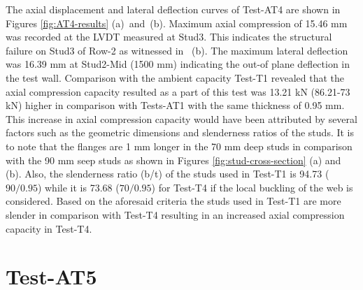 The axial displacement and lateral deflection curves of Test-AT4 are shown in Figures \ref{fig:AT4-results} (a)~and~(b). Maximum axial compression of 15.46 mm was recorded at the LVDT measured at Stud3. This indicates the structural failure on Stud3 of Row-2 as witnessed in ~(b). The maximum lateral deflection was 16.39 mm at Stud2-Mid (1500 mm) indicating the out-of plane deflection in the test wall. Comparison with the ambient capacity Test-T1 revealed that the axial compression capacity resulted as a part of this test was 13.21 kN (86.21-73 kN) higher in comparison with Tests-AT1 with the same thickness of 0.95 mm. This increase in axial compression capacity would have been attributed by several factors such as the geometric dimensions and slenderness ratios of the studs. It is to note that the flanges are 1 mm longer in the 70 mm deep studs in comparison with the 90 mm seep studs as shown in Figures \ref{fig:stud-cross-section} (a) and (b). Also, the slenderness ratio (b/t) of the studs used in Test-T1 is 94.73 ($90/0.95$) while it is 73.68 ($70/0.95$) for Test-T4 if the local buckling of the web is considered. Based on the aforesaid criteria the studs used in Test-T1 are more slender in comparison with Test-T4 resulting in an increased axial compression capacity in Test-T4. 


\section{Test-AT5}

